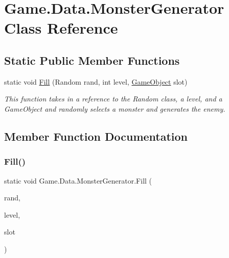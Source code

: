 \hypertarget{class_game_1_1_data_1_1_monster_generator}{}\section{Game.\+Data.\+Monster\+Generator Class Reference}
\label{class_game_1_1_data_1_1_monster_generator}
\subsection*{Static Public Member Functions}
\begin{DoxyCompactItemize}
\item 
static void \mbox{\hyperlink{class_game_1_1_data_1_1_monster_generator_af19d4d4af73485500bf648541c0a732b}{Fill}} (Random rand, int level, \mbox{\hyperlink{class_ecs_1_1_game_object}{Game\+Object}} slot)
\begin{DoxyCompactList}\small\item\em This function takes in a reference to the Random class, a level, and a Game\+Object and randomly selects a monster and generates the enemy. \end{DoxyCompactList}\end{DoxyCompactItemize}


\subsection{Member Function Documentation}
\mbox{\label{class_game_1_1_data_1_1_monster_generator_af19d4d4af73485500bf648541c0a732b}} 
\subsubsection{\texorpdfstring{Fill()}{Fill()}}
{\footnotesize\ttfamily static void Game.\+Data.\+Monster\+Generator.\+Fill (\begin{DoxyParamCaption}\item[{Random}]{rand,  }\item[{int}]{level,  }\item[{\mbox{\hyperlink{class_ecs_1_1_game_object}{Game\+Object}}}]{slot }\end{DoxyParamCaption})\hspace{0.3cm}{\ttfamily [static]}}




